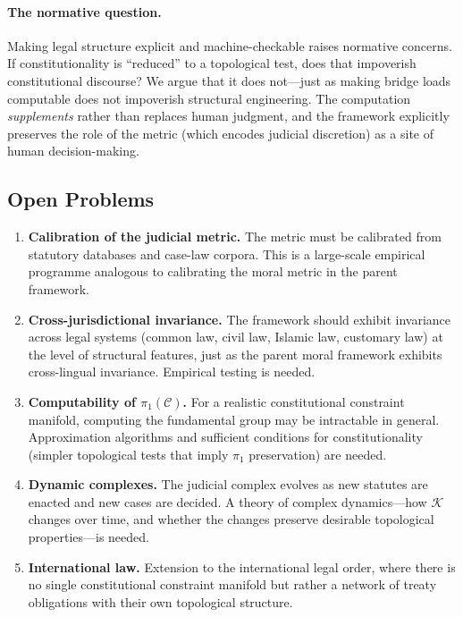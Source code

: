 \documentclass[12pt]{article}
\theoremstyle{definition}
\theoremstyle{remark}
\newcommand{\C}{\mathcal{C}}               %
\begin{document}
\paragraph{The normative question.}
Making legal structure explicit and machine-checkable raises normative concerns.  If constitutionality is ``reduced'' to a topological test, does that impoverish constitutional discourse?  We argue that it does not---just as making bridge loads computable does not impoverish structural engineering.  The computation \emph{supplements} rather than replaces human judgment, and the framework explicitly preserves the role of the metric (which encodes judicial discretion) as a site of human decision-making.

\subsection{Open Problems}

\begin{enumerate}
    \item \textbf{Calibration of the judicial metric.}  The metric must be calibrated from statutory databases and case-law corpora.  This is a large-scale empirical programme analogous to calibrating the moral metric in the parent framework.

    \item \textbf{Cross-jurisdictional invariance.}  The framework should exhibit invariance across legal systems (common law, civil law, Islamic law, customary law) at the level of structural features, just as the parent moral framework exhibits cross-lingual invariance.  Empirical testing is needed.

    \item \textbf{Computability of $\pi_1(\C)$.}  For a realistic constitutional constraint manifold, computing the fundamental group may be intractable in general.  Approximation algorithms and sufficient conditions for constitutionality (simpler topological tests that imply $\pi_1$ preservation) are needed.

    \item \textbf{Dynamic complexes.}  The judicial complex evolves as new statutes are enacted and new cases are decided.  A theory of complex dynamics---how $\mathcal{K}$ changes over time, and whether the changes preserve desirable topological properties---is needed.

    \item \textbf{International law.}  Extension to the international legal order, where there is no single constitutional constraint manifold but rather a network of treaty obligations with their own topological structure.
\end{enumerate}
\end{document}
